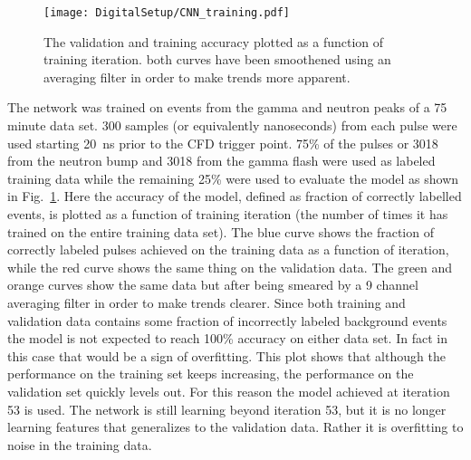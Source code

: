 \documentclass[main.tex]{subfiles}
\begin{document}
\begin{figure}[ht!]
    \centering
        \texttt{[image: DigitalSetup/CNN\_training.pdf]}
        \caption[Training and validation accuracy of the CNN]{The validation and training accuracy plotted as a function of training iteration. both curves have been smoothened using an averaging filter in order to make trends more apparent.}
    \label{fig:CNN_training} 
\end{figure}

The network was trained on events from the gamma and neutron peaks of a 75 minute data set. 300 samples (or equivalently nanoseconds) from each pulse were used starting \SI{20}{ns} prior to the CFD trigger point. 75\% of the pulses or 3018 from the neutron bump and 3018 from the gamma flash were used as labeled training data while the remaining 25\% were used to evaluate the model as shown in Fig.~\ref{fig:CNN_training}. Here the accuracy of the model, defined as fraction of correctly labelled events, is plotted as a function of training iteration (the number of times it has trained on the entire training data set). The blue curve shows the fraction of correctly labeled pulses achieved on the training data as a function of iteration, while the red curve shows the same thing on the validation data. The green and orange curves show the same data but after being smeared by a 9 channel averaging filter in order to make trends clearer. Since both training and validation data contains some fraction of incorrectly labeled background events the model is not expected to reach 100\% accuracy on either data set. In fact in this case that would be a sign of overfitting. This plot shows that although the performance on the training set keeps increasing, the performance on the validation set quickly levels out. For this reason the model achieved at iteration 53 is used. The network is still learning beyond iteration 53, but it is no longer learning features that generalizes to the validation data. Rather it is overfitting to noise in the training data.
\end{document}
